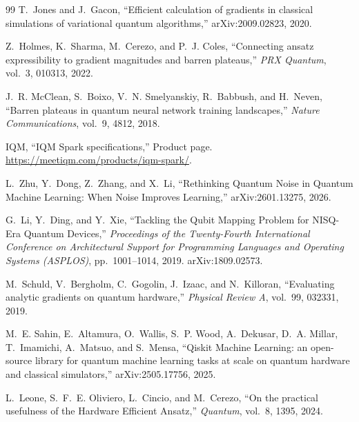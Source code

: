 \documentclass[11pt]{article}
\begin{document}
\begin{thebibliography}{99}
T.~Jones and J.~Gacon,
\newblock ``Efficient calculation of gradients in classical simulations of variational quantum algorithms,''
\newblock arXiv:2009.02823, 2020.

Z.~Holmes, K.~Sharma, M.~Cerezo, and P.~J. Coles,
\newblock ``Connecting ansatz expressibility to gradient magnitudes and barren plateaus,''
\newblock \emph{PRX Quantum}, vol.~3, 010313, 2022.

J.~R. McClean, S.~Boixo, V.~N. Smelyanskiy, R.~Babbush, and H.~Neven,
\newblock ``Barren plateaus in quantum neural network training landscapes,''
\newblock \emph{Nature Communications}, vol.~9, 4812, 2018.

IQM,
\newblock ``IQM Spark specifications,''
\newblock Product page.
\newblock \url{https://meetiqm.com/products/iqm-spark/}.

L.~Zhu, Y.~Dong, Z.~Zhang, and X.~Li,
\newblock ``Rethinking Quantum Noise in Quantum Machine Learning: When Noise Improves Learning,''
\newblock arXiv:2601.13275, 2026.

G.~Li, Y.~Ding, and Y.~Xie,
\newblock ``Tackling the Qubit Mapping Problem for NISQ-Era Quantum Devices,''
\newblock \emph{Proceedings of the Twenty-Fourth International Conference on Architectural Support for Programming Languages and Operating Systems (ASPLOS)}, pp.~1001--1014, 2019.
\newblock arXiv:1809.02573.

M.~Schuld, V.~Bergholm, C.~Gogolin, J.~Izaac, and N.~Killoran,
\newblock ``Evaluating analytic gradients on quantum hardware,''
\newblock \emph{Physical Review A}, vol.~99, 032331, 2019.

M.~E. Sahin, E.~Altamura, O.~Wallis, S.~P. Wood, A.~Dekusar, D.~A. Millar, T.~Imamichi, A.~Matsuo, and S.~Mensa,
\newblock ``Qiskit Machine Learning: an open-source library for quantum machine learning tasks at scale on quantum hardware and classical simulators,''
\newblock arXiv:2505.17756, 2025.

L.~Leone, S.~F.~E. Oliviero, L.~Cincio, and M.~Cerezo,
\newblock ``On the practical usefulness of the Hardware Efficient Ansatz,''
\newblock \emph{Quantum}, vol.~8, 1395, 2024.

\end{thebibliography}
\end{document}
